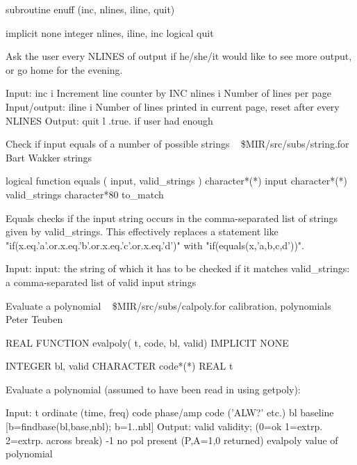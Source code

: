 \par{\tenpoint
{\eightpoint\begintt
      subroutine enuff (inc, nlines, iline, quit)

      implicit none
      integer nlines, iline, inc
      logical quit

     Ask the user every NLINES of output if he/she/it would like to
     see more output, or go home for the evening.

     Input:
       inc     i      Increment line counter by INC
       nlines  i      Number of lines per page
     Input/output:
       iline   i      Number of lines printed in current page, reset
                      after every NLINES
     Output:
       quit    l      .true. if user had enough
\endtt}
\par}
%
\noindent Check if input equals of a number of possible strings
\newline \ 
\newline {} \$MIR/src/subs/string.for
\newline {} Bart Wakker
\newline {} strings
\par{\tenpoint
{\eightpoint\begintt
      logical function equals ( input, valid_strings )
      character*(*) input
      character*(*) valid_strings
      character*80  to_match

 Equals checks if the input string occurs in the comma-separated list of
 strings given by valid_strings. This effectively replaces a statement like
 "if(x.eq.'a'.or.x.eq.'b'.or.x.eq.'c'.or.x.eq.'d')" with
 "if(equals(x,'a,b,c,d'))".

 Input:
   input:         the string of which it has to be checked if it matches
   valid_strings: a comma-separated list of valid input strings
\endtt}
\par}
%
\noindent Evaluate a polynomial
\newline \ 
\newline {} \$MIR/src/subs/calpoly.for
\newline {} calibration, polynomials
\newline \abox{Responsible:} Peter Teuben
\par{\tenpoint
{\eightpoint\begintt
        REAL FUNCTION evalpoly( t, code, bl, valid)
        IMPLICIT NONE

        INTEGER   bl, valid
        CHARACTER code*(*)
        REAL      t

   Evaluate a polynomial (assumed to have been read in using
   getpoly):

   Input:
       t         ordinate (time, freq)
       code      phase/amp code ('ALW?' etc.)
       bl        baseline [b=findbase(bl,base,nbl); b=1..nbl]
   Output:
       valid     validity; (0=ok  1=extrp. 2=extrp. across break)
                            -1 no pol present (P,A=1,0 returned)
       evalpoly  value of polynomial
\endtt}
\par}
